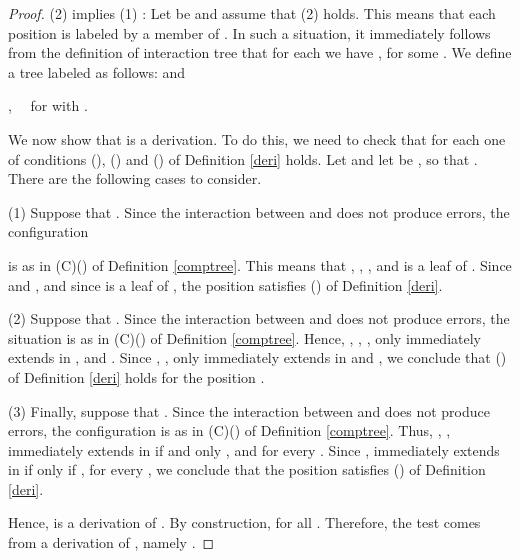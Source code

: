 \documentclass[copyright,creativecommons]{eptcs}
\theoremstyle{definition}
\newcommand{\squishlist}{
 \begin{list}{}
  { \setlength{\itemsep}{0pt}
     \setlength{\parsep}{3pt}
     \setlength{\topsep}{3pt}
     \setlength{\partopsep}{0pt}
     \setlength{\leftmargin}{1em}
     \setlength{\labelwidth}{1.5em}
     \setlength{\labelsep}{0.5em} } }
\newcommand{\squishend}{
  \end{list}  }
\begin{document}
\begin{proof}
  (2) implies (1)   :      Let  be  and assume that (2) holds.
This means that each position 
 is labeled by a member of .  In  such a situation, it immediately  follows from the definition of interaction tree that     for each
  we have
, for some
 .
We  define a tree  labeled  as follows:  and  \squishlist
\item[] {\centering
 \enspace, \ \
 for    with   \enspace.
 \par}

\squishend
We now show that  is a derivation. To do this,
we need to check that for each 
one of    conditions  (),  () and  () of Definition
\ref{deri} holds.
Let   and let  be , so that
. There are the following cases to consider.



(1) Suppose that .
Since the interaction between \/\@ and  \/\@
 does not produce errors, the configuration

is as  in (C)()
 of Definition \ref{comptree}. This means that
 , ,
 ,
  and
   is a leaf of .  Since  and
 ,  and since   is  a leaf of , the position
  satisfies   () of Definition
\ref{deri}.



(2) Suppose that . Since the interaction between \/\@ and  \/\@
 does not produce errors,  the situation is as in
 (C)()
 of Definition \ref{comptree}. Hence,
 ,
 , ,
 only  immediately extends  in ,
 and   .
  Since  ,
  ,
 only  immediately extends  in 
 and   , we conclude that
 () of Definition
\ref{deri} holds for the position .



(3) Finally, suppose that .
Since the interaction between \/\@ and  \/\@
 does not produce errors, the configuration
 is as in  (C)()
 of Definition \ref{comptree}. Thus,
 ,
 ,
 immediately extends  in  if and only ,
 and   
 for every .
  Since ,
 immediately extends  in  if only if ,
    for every , we conclude that
 the position
  satisfies   () of Definition
\ref{deri}.



Hence,  is a derivation of .
By construction,  for all
. Therefore, the test \/\@ comes from a derivation of \/\@, namely \/\@. \end{proof}









\nocite{*}


\end{document}
